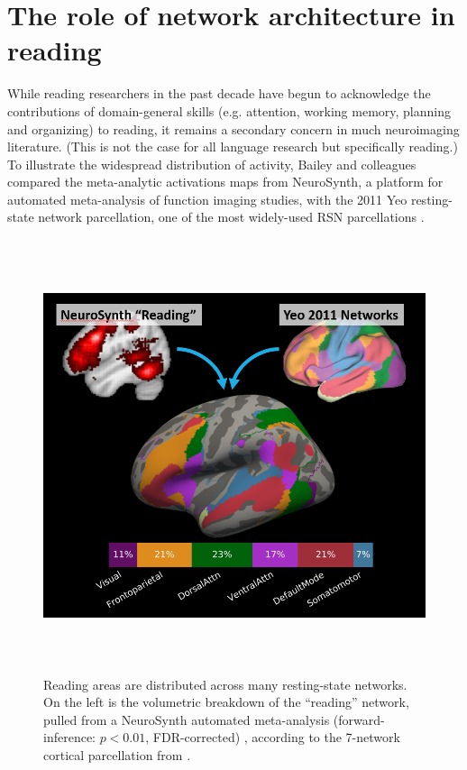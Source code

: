 \section{The role of network architecture in reading}

While reading researchers in the past decade have begun to acknowledge the contributions of domain-general skills (e.g. attention, working memory, planning and organizing) to reading, it remains a secondary concern in much neuroimaging literature. (This is not the case for all language research but specifically reading.) To illustrate the widespread distribution of activity, Bailey and colleagues compared the meta-analytic activations maps from NeuroSynth, a platform for automated meta-analysis of function imaging studies, with the 2011 Yeo resting-state network parcellation, one of the most widely-used RSN parcellations \citep{Bailey2018, Yarkoni2008a, Yeo2011}. 

\begin{figure}[t]
\centering
\includegraphics[height=5in]{images/ch1-yeo-to-neurosynth.png}
    \caption[Reading areas are distributed across many resting-state networks]{Reading areas are distributed across many resting-state networks. On the left is the volumetric breakdown of the ``reading'' network, pulled from a NeuroSynth automated meta-analysis (forward-inference: $p < 0.01$, FDR-corrected) \citep{Yarkoni2011}, according to the 7-network cortical parcellation from \cite{Yeo2011}.}
    \label{fig:ch1-yeo-to-neurosynth}
\end{figure}

